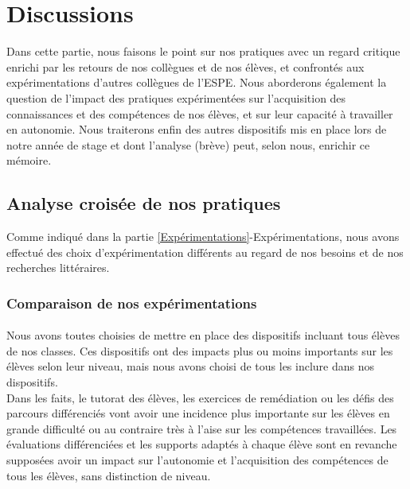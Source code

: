 \section{Discussions}
Dans cette partie, nous faisons le point sur nos pratiques avec un regard critique enrichi par les retours de nos collègues et de nos élèves, et confrontés aux expérimentations d'autres collègues de l'ESPE. Nous aborderons également la question de l'impact des pratiques expérimentées sur l'acquisition des connaissances et des compétences de nos élèves, et sur leur capacité à travailler en autonomie. Nous traiterons enfin des autres dispositifs mis en place lors de notre année de stage et dont l'analyse (brève) peut, selon nous, enrichir ce mémoire.
\subsection{Analyse croisée de nos pratiques}
Comme indiqué dans la partie \ref{Expérimentations}-Expérimentations, nous avons effectué des choix d'expérimentation différents au regard de nos besoins et de nos recherches littéraires.\\
\subsubsection{Comparaison de nos expérimentations}
\paragraph*{}Nous avons toutes choisies de mettre en place des dispositifs incluant tous élèves de nos classes. Ces dispositifs ont des impacts plus ou moins importants sur les élèves selon leur niveau, mais nous avons choisi de tous les inclure dans nos dispositifs.\\
Dans les faits, le tutorat des élèves, les exercices de remédiation ou les défis des parcours différenciés vont avoir une incidence plus importante sur les élèves en grande difficulté ou au contraire très à l'aise sur les compétences travaillées. Les évaluations différenciées et les supports adaptés à chaque élève sont en revanche supposées avoir un impact sur l'autonomie et l'acquisition des compétences de tous les élèves, sans distinction de niveau.\\
